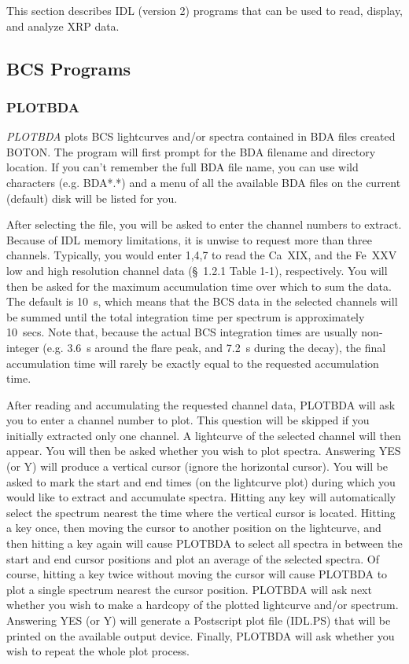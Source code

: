 This section describes IDL (version 2) programs that can be used
to read, display, and analyze XRP data.

\subsection{BCS Programs}

\subsubsection{PLOTBDA}

{\em PLOTBDA} plots BCS lightcurves and/or spectra contained in BDA files
created BOTON.   The program will first prompt for the
BDA filename and directory location. If you can't remember the full BDA file
name, you can use wild characters (e.g. BDA*.*) and a menu of all the available
BDA files on the current (default) disk  will be listed for you.

After selecting the file, you will be asked to enter the channel numbers to
extract. Because of IDL memory limitations, it is unwise to request more than
three channels. Typically, you would enter 1,4,7 to read the Ca~XIX, and the
Fe~XXV low and high resolution channel data (\S~1.2.1 Table 1-1), respectively.
You will then be asked for the maximum accumulation time over which to sum the
data. The default is 10~s, which means that the BCS data in the selected
channels will be summed until the total integration time per spectrum is
approximately 10~secs. Note that, because the actual BCS integration times are
usually non-integer (e.g. 3.6~s around the flare peak, and 7.2~s during the
decay), the final accumulation time will rarely be exactly equal to the
requested accumulation time.

After reading and accumulating the requested channel data, PLOTBDA will ask you
to enter a channel number to plot. This question will be skipped if you
initially extracted only one channel. A lightcurve of the selected channel will
then appear. You will then be asked whether you wish to plot spectra. Answering
YES (or Y) will produce a vertical cursor (ignore the horizontal cursor). You
will be asked to mark the start and end times (on the lightcurve plot) during
which you would like to extract and accumulate spectra.   Hitting any key will
automatically select the spectrum nearest the time where the vertical cursor is
located. Hitting a key once, then moving the cursor to another position on the
lightcurve, and then hitting a key again will cause PLOTBDA to select all
spectra in between the start and end cursor positions and  plot an average of
the selected spectra. Of course, hitting a key twice without moving the cursor
will cause PLOTBDA to plot a single spectrum nearest the cursor position.
PLOTBDA will ask next whether you wish to make a hardcopy of the plotted
lightcurve and/or spectrum. Answering YES (or Y) will generate a Postscript
plot file (IDL.PS) that will be printed on the available output device.
Finally, PLOTBDA will ask whether you wish to repeat the whole plot process.

